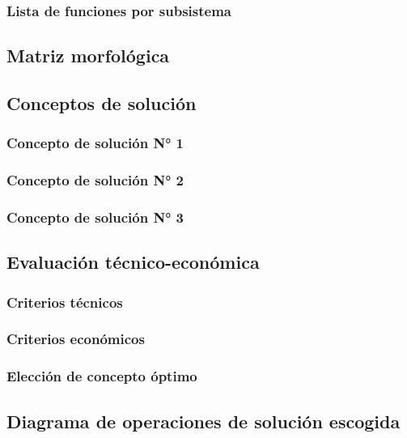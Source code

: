 \subsubsection{Lista de funciones por subsistema}

\subsection{Matriz morfológica}

\subsection{Conceptos de solución}

\subsubsection{Concepto de solución N° 1}

\subsubsection{Concepto de solución N° 2}

\subsubsection{Concepto de solución N° 3}

\subsection{Evaluación técnico-económica}

\subsubsection{Criterios técnicos}

\subsubsection{Criterios económicos}

\subsubsection{Elección de concepto óptimo}

\subsection{Diagrama de operaciones de solución escogida}




